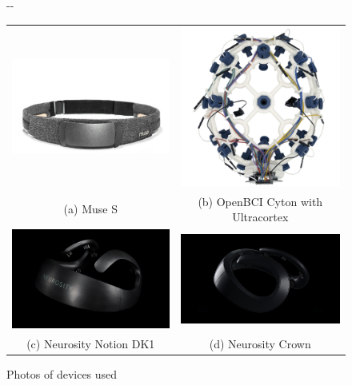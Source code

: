 \documentclass[a4paper]{article}
\newlength{\offsetpage}
\newenvironment{widepage}{\begin{adjustwidth}{-\offsetpage}{-\offsetpage}%
    \addtolength{\textwidth}{2\offsetpage}}%
{\end{adjustwidth}}
\begin{document}
\begin{refsection}
            \begin{center}
            \begin{figure}
                \begin{widepage}
                \begin{tabular}{cc}
                    \includegraphics[width=65mm]{img/Muse-S.jpg}
                    & \includegraphics[width=65mm]{img/openbci-cyton.jpg}
                    \\
                    (a) Muse S
                    & (b) OpenBCI Cyton with Ultracortex
                    \\[6pt]
                    \includegraphics[width=65mm]{img/neurosity-notion.png}
                    & \includegraphics[width=65mm]{img/neurosity-crown.jpg}
                    \\
                    (c) Neurosity Notion DK1
                    & (d) Neurosity Crown
                    \\[6pt]
                \end{tabular}
                \caption{Photos of devices used}
                \end{widepage}
            \end{figure}
            \end{center}


\end{refsection}
\end{document}
